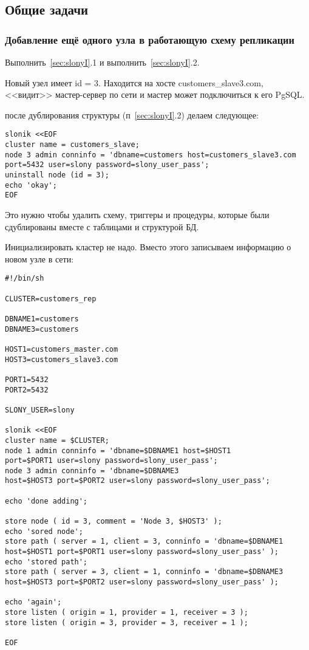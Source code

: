 \subsection{Общие задачи}
\subsubsection{Добавление ещё одного узла в работающую схему репликации}
Выполнить~\ref{sec:slonyI}.1 и выполнить~\ref{sec:slonyI}.2.

Новый узел имеет id = 3. Находится на хосте customers\_slave3.com, <<видит>> мастер-сервер по сети и
мастер может подключиться к его PgSQL.

после дублирования структуры (п~\ref{sec:slonyI}.2) делаем следующее:
\begin{lstlisting}[label=lst:slony13,caption=Общие задачи]
slonik <<EOF
cluster name = customers_slave;
node 3 admin conninfo = 'dbname=customers host=customers_slave3.com
port=5432 user=slony password=slony_user_pass';
uninstall node (id = 3);
echo 'okay';
EOF
\end{lstlisting}

Это нужно чтобы удалить схему, триггеры и процедуры, которые были сдублированы вместе с таблицами и структурой БД.

Инициализировать кластер не надо. Вместо этого записываем информацию о новом узле в сети:
\begin{lstlisting}[label=lst:slony14,caption=Общие задачи]
#!/bin/sh

CLUSTER=customers_rep

DBNAME1=customers
DBNAME3=customers

HOST1=customers_master.com
HOST3=customers_slave3.com

PORT1=5432
PORT2=5432

SLONY_USER=slony

slonik <<EOF
cluster name = $CLUSTER;
node 1 admin conninfo = 'dbname=$DBNAME1 host=$HOST1
port=$PORT1 user=slony password=slony_user_pass';
node 3 admin conninfo = 'dbname=$DBNAME3
host=$HOST3 port=$PORT2 user=slony password=slony_user_pass';

echo 'done adding';

store node ( id = 3, comment = 'Node 3, $HOST3' );
echo 'sored node';
store path ( server = 1, client = 3, conninfo = 'dbname=$DBNAME1
host=$HOST1 port=$PORT1 user=slony password=slony_user_pass' );
echo 'stored path';
store path ( server = 3, client = 1, conninfo = 'dbname=$DBNAME3
host=$HOST3 port=$PORT2 user=slony password=slony_user_pass' );

echo 'again';
store listen ( origin = 1, provider = 1, receiver = 3 );
store listen ( origin = 3, provider = 3, receiver = 1 );

EOF
\end{lstlisting}

